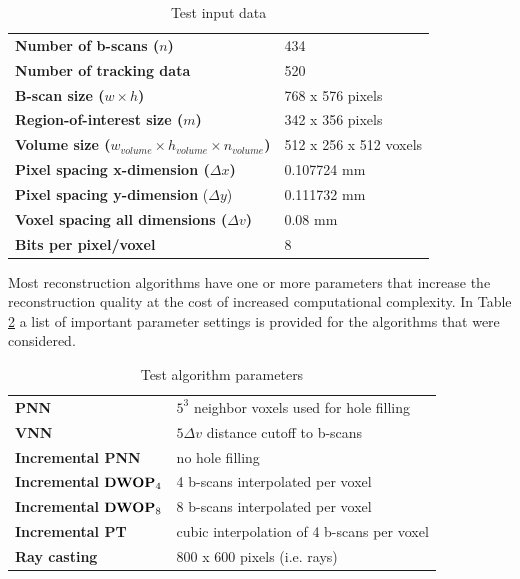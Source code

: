 	\begin{table}[h]
	\centering
	\begin{tabular}{| l l |}
		\hline
		\textbf{Number of b-scans ($n$)} & 434 \\
		\textbf{Number of tracking data} & 520 \\
		\textbf{B-scan size ($w \times h$)} & 768 x 576 pixels \\
		\textbf{Region-of-interest size ($m$)} & 342 x 356 pixels \\
		\textbf{Volume size ($w_{volume} \times h_{volume} \times n_{volume}$)} & 512 x 256 x 512 voxels \\
		\textbf{Pixel spacing x-dimension ($\Delta x$)} & 0.107724 mm \\
		\textbf{Pixel spacing y-dimension} ($\Delta y$) & 0.111732 mm \\
		\textbf{Voxel spacing all dimensions ($\Delta v$)} & 0.08 mm \\
		\textbf{Bits per pixel/voxel} & 8 \\
		\hline
	\end{tabular}
	\caption{Test input data}
	\label{table:test_input}
	\end{table}
	
	Most reconstruction algorithms have one or more parameters that increase the reconstruction quality at the cost of increased computational complexity. In Table \ref{table:test_parameters} a list of important parameter settings is provided for the algorithms that were considered.
	
	\begin{table}[h]
	\centering
	\begin{tabular}{| l l |}
		\hline
		\textbf{PNN} & $5^3$ neighbor voxels used for hole filling \\
		\textbf{VNN} & $5\Delta v$ distance cutoff to b-scans \\
		\textbf{Incremental PNN} & no hole filling \\
		\textbf{Incremental} $\textbf{DWOP}_4$ & 4 b-scans interpolated per voxel \\
		\textbf{Incremental} $\textbf{DWOP}_8$ & 8 b-scans interpolated per voxel \\
		\textbf{Incremental PT} & cubic interpolation of 4 b-scans per voxel \\
		\textbf{Ray casting} & 800 x 600 pixels (i.e. rays) \\
		\hline
	\end{tabular}
	\caption{Test algorithm parameters}
	\label{table:test_parameters}
	\end{table}

